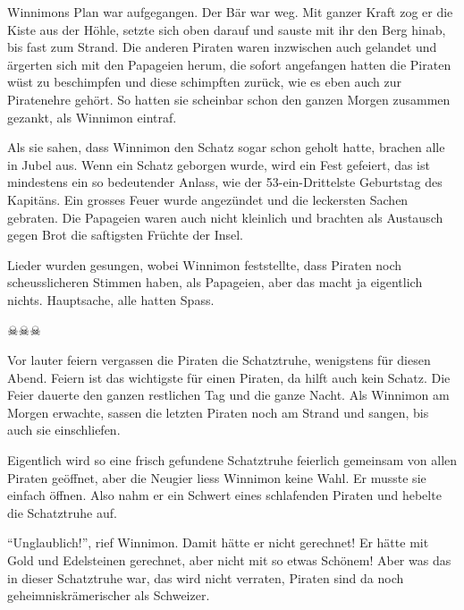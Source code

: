 Winnimons Plan war aufgegangen. Der Bär war weg. Mit ganzer Kraft zog er die Kiste aus der Höhle, setzte sich oben darauf und sauste mit ihr den Berg hinab, bis fast zum Strand. Die anderen Piraten waren inzwischen auch gelandet und ärgerten sich mit den Papageien herum, die sofort angefangen hatten die Piraten wüst zu beschimpfen und diese schimpften zurück, wie es eben auch zur Piratenehre gehört. So hatten sie scheinbar schon den ganzen Morgen zusammen gezankt, als Winnimon eintraf.

Als sie sahen, dass Winnimon den Schatz sogar schon geholt hatte, brachen alle in Jubel aus. Wenn ein Schatz geborgen wurde, wird ein Fest gefeiert, das ist mindestens ein so bedeutender Anlass, wie der 53-ein-Drittelste Geburtstag des Kapitäns. Ein grosses Feuer wurde angezündet und die leckersten Sachen gebraten. Die Papageien waren auch nicht kleinlich und brachten als Austausch gegen Brot die saftigsten Früchte der Insel. 

Lieder wurden gesungen, wobei Winnimon feststellte, dass Piraten noch scheusslicheren Stimmen haben, als Papageien, aber das macht ja eigentlich nichts. Hauptsache, alle hatten Spass.


\begin{center}
{\color{DeepPink} $\skull \skull \skull$}
\end{center}

Vor lauter feiern vergassen die Piraten die Schatztruhe, wenigstens für diesen
Abend. Feiern ist das wichtigste für einen Piraten, da hilft auch kein Schatz.
Die Feier dauerte den ganzen restlichen Tag und die ganze Nacht. Als Winnimon
am Morgen erwachte, sassen die letzten Piraten noch am Strand und sangen, bis auch sie einschliefen.

Eigentlich wird so eine frisch gefundene Schatztruhe feierlich gemeinsam von allen Piraten geöffnet, aber die Neugier liess Winnimon keine Wahl. Er musste sie einfach öffnen. Also nahm er ein Schwert eines schlafenden Piraten und hebelte die Schatztruhe auf.

\enquote{Unglaublich!}, rief Winnimon. Damit hätte er nicht gerechnet! Er hätte
mit Gold und Edelsteinen gerechnet, aber nicht mit so etwas Schönem! Aber was
das in dieser Schatztruhe war, das wird nicht verraten, Piraten sind da noch
geheimniskrämerischer als Schweizer. \hfill {\color{DeepPink}\decofourleft}
